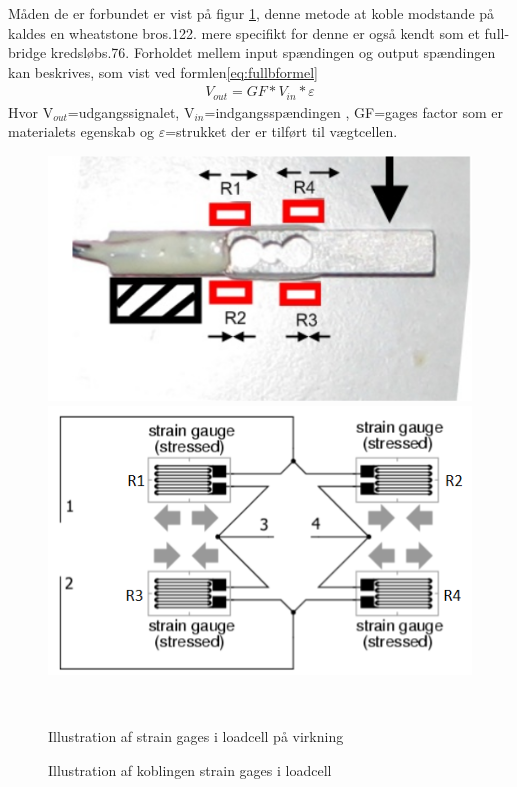  Måden de er forbundet er vist på figur \ref{fig:loadcell2}, denne metode at koble modstande på kaldes en wheatstone bro\citep{ELengbog}{s.122}. mere specifikt for denne er også kendt som et full-bridge kredsløb\citep{AETbog}{s.76}. Forholdet mellem input spændingen og output spændingen kan beskrives, som vist ved formlen\ref{eq:fullbformel}
\begin{align}
 V_{out}=GF*V_{in}*\varepsilon
 \label{eq:fullbformel}
 \end{align}
 Hvor V$_{out}$=udgangssignalet, V$_{in}$=indgangsspændingen , GF=gages factor som er materialets egenskab og $\varepsilon$=strukket der er tilført til vægtcellen.

\begin{figure}[htbp] \centering
\begin{minipage}[b]{0.48\textwidth} \centering
\includegraphics[width=1.00\textwidth]{billeder/Hardware/loadcell1.PNG} %
\end{minipage} \hfill
\begin{minipage}[b]{0.48\textwidth} \centering
\includegraphics[width=1.00\textwidth]{billeder/Hardware/straingages2.PNG} %
\end{minipage} \\ %
\begin{minipage}[t]{0.48\textwidth}
\caption{Illustration af strain gages i loadcell på virkning} %
\label{fig:Loadcell1}
\end{minipage} \hfill
\begin{minipage}[t]{0.48\textwidth}
\caption{Illustration af koblingen strain gages i loadcell} %
\label{fig:loadcell2}
\end{minipage}
\end{figure}
